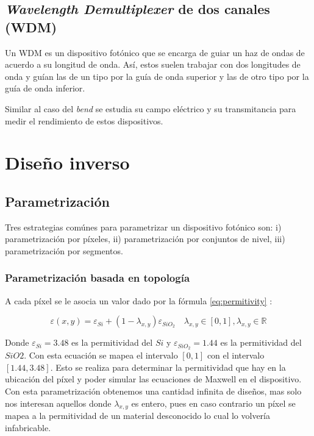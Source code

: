 \subsection{\emph{Wavelength Demultiplexer} de dos canales (WDM)}

Un WDM es un dispositivo fotónico que se encarga de guiar un haz de ondas de acuerdo a su longitud de onda.
Así, estos suelen trabajar con dos longitudes de onda y guían las de un tipo por la guía de onda superior y las de otro tipo por la guía de onda inferior.

Similar al caso del \emph{bend} se estudia su campo eléctrico y su transmitancia para medir el rendimiento de estos dispositivos.

\section{Diseño inverso}

\subsection{Parametrización}

Tres estrategias comúnes para parametrizar un dispositivo fotónico son: i) parametrización por píxeles, ii) parametrización por conjuntos de nivel, iii) parametrización por segmentos.

\subsubsection{Parametrización basada en topología}

A cada píxel se le asocia un valor dado por la fórmula \ref{eq:permitivity} \citep{Su2020}:

\begin{equation}
  \varepsilon(x, y) = \varepsilon_{Si} + (1 - \lambda_{x,y}) \varepsilon_{SiO_2} \quad \lambda_{x, y} \in [0, 1], \lambda_{x, y} \in \mathbb{R} 
\label{eq:permitivity}
\end{equation}

Donde $\varepsilon_{Si} = 3.48$ es la permitividad del $Si$ y $\varepsilon_{SiO_2} = 1.44$ es la permitividad del $SiO2$.
Con esta ecuación se mapea el intervalo $[0, 1]$ con el intervalo $[1.44, 3.48]$. 
Esto se realiza para determinar la permitividad que hay en la ubicación del píxel y poder simular las ecuaciones de Maxwell en el dispositivo.
Con esta parametrización obtenemos una cantidad infinita de diseños, mas solo nos interesan aquellos donde $\lambda_{x,y}$ es entero, pues en caso contrario un píxel se mapea a la permitividad de un material desconocido lo cual lo volvería infabricable.


